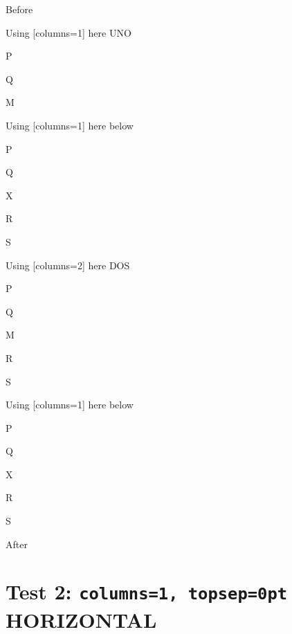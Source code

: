 \documentclass[10pt]{article}
\begin{document}
Before
\begin{enumext}[columns=2]

\item Using [columns=1] here UNO
  \begin{enumext}[columns=1]
     \item  P \item Q \item M %
  \end{enumext}

\item Using [columns=1] here below
\begin{enumext}[columns=1]
     \item  P \item Q \item X  \item R \item S
  \end{enumext}

\columnbreak

\item Using [columns=2] here DOS
  \begin{enumext}[columns=2]
    \item  P \item Q \item M \item R \item S
  \end{enumext}

\item Using [columns=1] here below
\begin{enumext}[columns=1]
     \item  P \item Q \item X  \item R \item S
  \end{enumext}

\end{enumext}
After

\newpage

\section{Test 2: \texttt{columns=1, topsep=0pt} HORIZONTAL}
\end{document}
